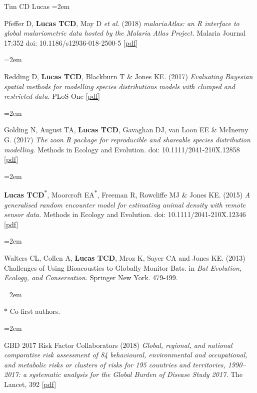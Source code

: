 \documentclass{scrartcl}
\newcommand{\MarginText}[1]{\marginpar{\raggedleft\itshape\small#1}} %
\newcommand{\Description}[1]{\hangindent=2em\hangafter=0\noindent\raggedright\footnotesize{#1}\par\normalsize\vspace{1em}} %
\begin{document}
\begin{cv}{Tim {\Large CD} Lucas}
\Description{Pfeffer D, \textbf{Lucas TCD}, May D \emph{et al.} (2018) \emph{malariaAtlas: an R interface to global malariometric data hosted by the Malaria Atlas Project.} Malaria Journal 17:352 doi: 10.1186/s12936-018-2500-5 [\href{https://malariajournal.biomedcentral.com/track/pdf/10.1186/s12936-018-2500-5}{pdf}]}


\Description{\MarginText{2017}Redding D, \textbf{Lucas TCD}, Blackburn T \& Jones KE. (2017) \emph{Evaluating Bayesian spatial methods for modelling species distributions models with clumped and restricted data.} PLoS One [\href{https://journals.plos.org/plosone/article/file?id=10.1371/journal.pone.0187602&type=printable}{pdf}]}

\Description{Golding N, August TA, \textbf{Lucas TCD}, Gavaghan DJ, van Loon EE \& McInerny G. (2017) \emph{The zoon R package for reproducible and shareable species distribution modelling}. Methods in Ecology and Evolution. doi: 10.1111/2041-210X.12858 [\href{http://onlinelibrary.wiley.com/doi/10.1111/2041-210X.12858/pdf}{pdf}]}

\Description{\MarginText{2015}\textbf{Lucas TCD}\textsuperscript{$\ast$}, Moorcroft EA\textsuperscript{$\ast$}, Freeman R, Rowcliffe MJ \& Jones KE. (2015) \emph{A generalised random encounter model for estimating animal density with remote sensor data.} Methods in Ecology and Evolution. doi: 10.1111/2041-210X.12346 [\href{http://onlinelibrary.wiley.com/doi/10.1111/2041-210X.12346/epdf}{pdf}]}

\Description{\MarginText{2013}Walters CL, Collen A, \textbf{Lucas TCD}, Mroz K, Sayer CA and Jones KE. (2013) Challenges of Using Bioacoustics to Globally Monitor Bats. in \emph{Bat Evolution, Ecology, and Conservation.} Springer New York. 479-499.}

\Description{\MarginText{} \scriptsize{ $\ast$ Co-first authors. } }



{\color{Maroon}}\vspace{1em}

\Description{\MarginText{2018}GBD 2017 Risk Factor Collaborators (2018) \emph{Global, regional, and national comparative risk assessment of 84 behavioural, environmental and occupational, and metabolic risks or clusters of risks for 195 countries and territories, 1990--2017: a systematic analysis for the Global Burden of Disease Study 2017.} The Lancet, 392 [\href{https://reader.elsevier.com/reader/sd/pii/S0140673618322256?token=B51BB41EDB592105E398079BFEE0CA91BB2DA80DC879A7B3CFD538DFBF8ADE6FA424858694B94E7860E6AE8461E553E7}{pdf}]}


\end{cv}
\end{document}
